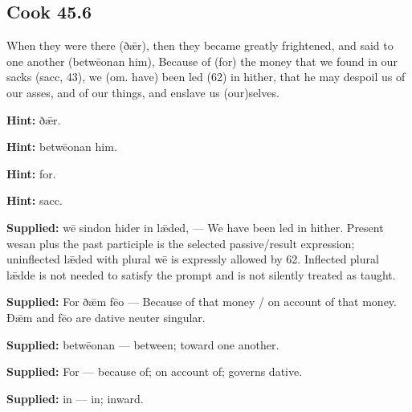 \par\begin{minipage}{\linewidth}\raggedright
\subsection*{Cook 45.6}

When they were there (ðǣr), then they became greatly frightened, and said to one another (betwēonan him), Because of (for) the money that we found in our sacks (sacc, 43), we (om. have) been led (62) in hither, that he may despoil us of our asses, and of our things, and enslave us (our)selves.

\textbf{Hint:} ðǣr.

\textbf{Hint:} betwēonan him.

\textbf{Hint:} for.

\textbf{Hint:} sacc.

\end{minipage}\par\addvspace{4pt}

\textbf{Supplied:} wē sindon hider in lǣded, — We have been led in hither. Present wesan plus the past participle is the selected passive/\allowbreak{}result expression; uninflected lǣded with plural wē is expressly allowed by 62. Inflected plural lǣdde is not needed to satisfy the prompt and is not silently treated as taught.

\textbf{Supplied:} For ðǣm fēo — Because of that money /\allowbreak{} on account of that money. Ðǣm and fēo are dative neuter singular.

\textbf{Supplied:} betwēonan — between; toward one another.

\textbf{Supplied:} For — because of; on account of; governs dative.

\textbf{Supplied:} in — in; inward.

